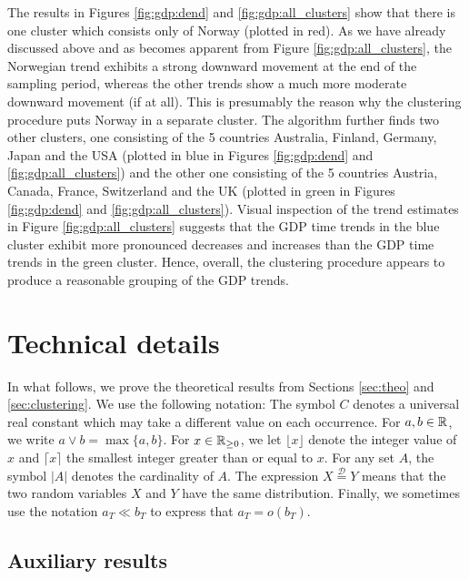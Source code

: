 \documentclass[12pt]{article}
\begin{document}
The results in Figures \ref{fig:gdp:dend} and \ref{fig:gdp:all_clusters} show that there is one cluster which consists only of Norway (plotted in red). As we have already discussed above and as becomes apparent from Figure \ref{fig:gdp:all_clusters}, the Norwegian trend exhibits a strong downward movement at the end of the sampling period, whereas the other trends show a much more moderate downward movement (if at all). This is presumably the reason why the clustering procedure puts Norway in a separate cluster. The algorithm further finds two other clusters, one consisting of the 5 countries Australia, Finland, Germany, Japan and the USA (plotted in blue in Figures \ref{fig:gdp:dend} and \ref{fig:gdp:all_clusters}) and the other one consisting of the 5 countries Austria, Canada, France, Switzerland and the UK (plotted in  green in Figures \ref{fig:gdp:dend} and \ref{fig:gdp:all_clusters}). Visual inspection of the trend estimates in Figure \ref{fig:gdp:all_clusters} suggests that the GDP time trends in the blue cluster exhibit more pronounced decreases and increases than the GDP time trends in the green cluster. Hence, overall, the clustering procedure appears to produce a reasonable grouping of the GDP trends.
 


\section{Technical details}\label{appendix}


In what follows, we prove the theoretical results from Sections \ref{sec:theo} and \ref{sec:clustering}. We use the following notation: The symbol $C$ denotes a universal real constant which may take a different value on each occurrence. For $a,b \in \mathbb{R}$, we write $a \vee b = \max\{a,b\}$. For $x \in \mathbb{R}_{\geq 0}$, we let $\lfloor x \rfloor$ denote the integer value of $x$ and $\lceil x \rceil$ the smallest integer greater than or equal to $x$. For any set $A$, the symbol $|A|$ denotes the cardinality of $A$. The expression $X \stackrel{\mathcal{D}}{=} Y$ means that the two random variables $X$ and $Y$ have the same distribution. Finally, we sometimes use the notation $a_T \ll b_T$ to express that $a_T = o(b_T)$. 



\enlargethispage{0.25cm}
\subsection*{Auxiliary results}\label{subsec:appendix:aux}
\end{document}
